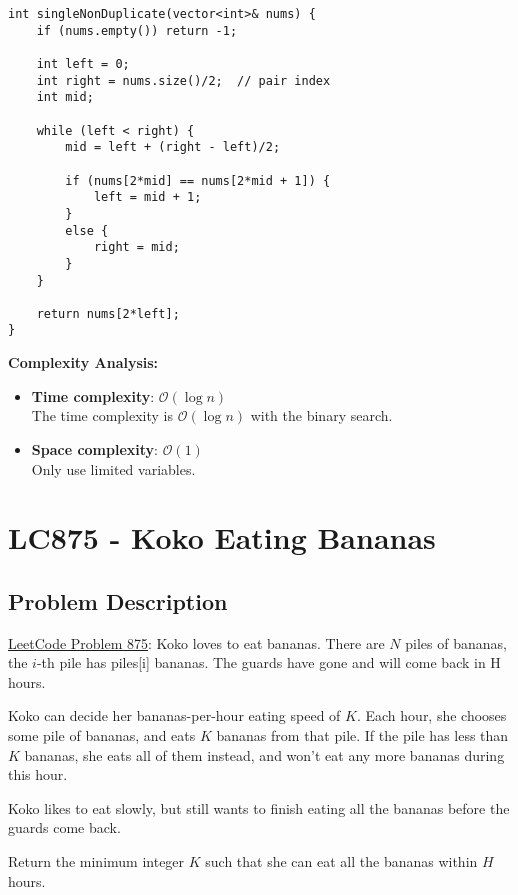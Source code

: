 \documentclass[justified]{tufte-book}
\begin{document}
\begin{lstlisting}
int singleNonDuplicate(vector<int>& nums) {
    if (nums.empty()) return -1;
    
    int left = 0;
    int right = nums.size()/2;  // pair index
    int mid;
    
    while (left < right) {
        mid = left + (right - left)/2;
        
        if (nums[2*mid] == nums[2*mid + 1]) {
            left = mid + 1;
        }
        else {
            right = mid;
        }
    }
    
    return nums[2*left];
}
\end{lstlisting}

\noindent \textbf{Complexity Analysis:}
\begin{itemize}
    \item \textbf{Time complexity}: $\mathcal{O}(\log n)$ \\
    The time complexity is $\mathcal{O}(\log n)$ with the binary search.
    \item \textbf{Space complexity}: $\mathcal{O}(1)$ \\
    Only use limited variables.
\end{itemize}

\section{LC875 - Koko Eating Bananas} \label{sec:lc875_koko_eat_banana}
\subsection{Problem Description}
\href{https://leetcode.com/problems/koko-eating-bananas/}{LeetCode Problem 875}: Koko loves to eat bananas.  There are $N$ piles of bananas, the $i$-th pile has piles[i] bananas.  The guards have gone and will come back in H hours.

Koko can decide her bananas-per-hour eating speed of $K$.  Each hour, she chooses some pile of bananas, and eats $K$ bananas from that pile.  If the pile has less than $K$ bananas, she eats all of them instead, and won't eat any more bananas during this hour.

Koko likes to eat slowly, but still wants to finish eating all the bananas before the guards come back.

Return the minimum integer $K$ such that she can eat all the bananas within $H$ hours. \\
\end{document}
